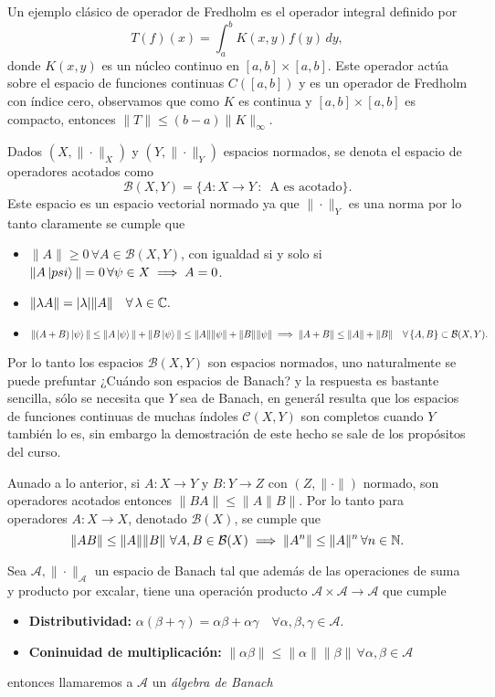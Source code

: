 \documentclass[main.tex]{subfiles}
\begin{document}
\eje Un ejemplo clásico de operador de Fredholm es el operador integral definido por
\[
T(f)(x) = \int_a^b K(x, y) f(y) \, dy,
\]
donde \(K(x, y)\) es un núcleo continuo en \([a, b] \times [a, b]\). Este operador actúa sobre el espacio de funciones continuas \(C([a, b])\) y es un operador de Fredholm con índice cero, observamos que como \(K\) es continua y  \([a, b] \times [a, b]\) es compacto, entonces \(\|T\|\leq(b-a)\|K\|_{\infty}\).

\obs Dados \((X,\|\cdot\|_X)\) y \((Y,\|\cdot\|_Y)\) espacios normados, se denota el espacio de operadores acotados como
\[
\mathcal{B}(X,Y)=\{A:X\to Y\,:\,\text{ A es acotado}\}.
\]
\noindent Este espacio es un espacio vectorial normado ya que \(\|\cdot\|_Y\) es una norma por lo tanto claramente se cumple que
\begin{itemize}
    \item \(\|A\| \geq 0\,\forall A \in\mathcal{B}(X,Y) \), con igualdad si y solo si \(\|A\ket{psi}\| = 0\,\forall\psi\in X\implies A = 0\).
    \item \(\|\lambda A\| = |\lambda|\|A\|\quad\forall\,\lambda\in\mathbb C .\)
    \item \(\|(A + B)\ket{\psi}\| \leq \|A\ket{\psi}\| + \|B\ket{\psi}\|\leq \|A\|\|\psi\| + \|B\|\|\psi\| \implies\| A + B\| \leq \|A\| + \|B\|\quad\forall\,\{A,B\}\subset\mathcal{B}(X,Y).\)
\end{itemize}

Por lo tanto los espacios \(\mathcal{B}(X,Y)\) son espacios normados, uno naturalmente se puede prefuntar ¿Cuándo son espacios de Banach? y la respuesta es bastante sencilla, sólo se necesita que \(Y\) sea de Banach, en generál resulta que los espacios de funciones continuas de muchas índoles \(\mathcal{C}(X,Y)\) son completos cuando \(Y\) también lo es, sin embargo la demostración de este hecho se sale de los propósitos del curso.

Aunado a lo anterior, si \(A:X\to Y\) y \(B:Y\to Z\) con \((Z,\|\cdot\|)\) normado, son operadores acotados entonces \(\|BA\|\leq\|A\|B\|\). Por lo tanto para operadores \(A:X\to X\), denotado \(\mathcal{B}(X)\), se cumple que
\[
\|AB\|\leq\|A\|\|B\|\,\,\forall A,B\in\mathcal{B}(X)\implies\|A^n\|\leq\|A\|^n\,\forall n\in \mathbb N .
\]

\begin{def.}
Sea \(\mathcal{A},\|\cdot\|_{\mathcal{A}}\) un espacio de Banach tal que además de las operaciones de suma y producto por excalar, tiene una operación producto \(\mathcal{A}\times\mathcal{A}\to\mathcal{A}\) que cumple
\begin{itemize}
    \item \textbf{Distributividad:} \(\alpha(\beta+\gamma)=\alpha\beta+\alpha\gamma\quad\forall\alpha,\beta,\gamma\in\mathcal{A}\).
    \item \textbf{Coninuidad de multiplicación:} \(\|\alpha\beta\|\leq\|\alpha\|\|\beta\|\,\forall\alpha,\beta\in\mathcal{A}\)
\end{itemize}
entonces llamaremos a \(\mathcal{A}\) un \emph{álgebra de Banach}
\end{def.}
\end{document}
